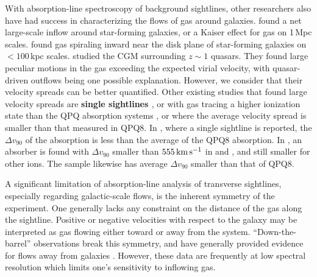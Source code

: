 \documentclass[iop]{emulateapj}
\begin{document}
With absorption-line spectroscopy of background sightlines, other researchers also have had
success in characterizing the flows of gas around galaxies. \cite{Rakic+12} found a net
large-scale inflow around star-forming galaxies, or a Kaiser effect for gas on
1\,Mpc scales. \cite{Ho+17} found gas spiraling inward near the disk plane of
star-forming galaxies on $<100$\,kpc scales. \cite{Johnson+15} studied the CGM surrounding
$z\sim1$ quasars. They found large peculiar motions in the gas exceeding the expected virial
velocity, with quasar-driven outflows being one possible explanation. However, we consider that
their velocity spreads can be better quantified. Other
existing studies that found large velocity spreads are {\bf single sightlines
\citep[e.g.,][]{Tripp+11,RudieNewmanMurphy17}}, or with gas tracing
a higher ionization state than the QPQ absorption systems \citep[e.g.,][]{Churchill+12}, or where
the average velocity spread is smaller than that measured in QPQ8. In \cite{Gauthier13}, where a
single sightline is reported, the $\Delta v_{90}$ of the  absorption is less than the
average of the QPQ8  absorption. In \cite{Muzahid+15}, an absorber is found with
$\Delta v_{90}$ smaller than $555\,{\rm km\,s^{-1}}$ in  and , and still
smaller for other ions. The \cite{Zahedy+16} sample likewise has average $\Delta v_{90}$ smaller
than that of QPQ8.

A significant limitation of absorption-line analysis of transverse sightlines, especially
regarding galactic-scale flows, is the inherent symmetry of the experiment. One generally lacks
any constraint on the distance of the gas along the sightline. Positive or negative velocities
with respect to the galaxy may be interpreted as gas flowing either toward or away from the
system. ``Down-the-barrel'' observations break this symmetry, and have generally provided evidence
for flows away from galaxies \citep{Rupke+05,Martin05,Weiner+09,Rubin+14}. However, these data are
frequently at low spectral resolution which limits one's sensitivity to inflowing gas.
\end{document}
